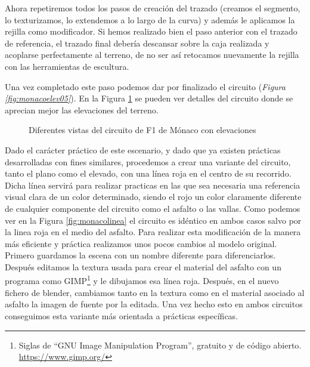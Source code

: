 Ahora repetiremos todos los pasos de creación del trazado (creamos el segmento, lo texturizamos, lo extendemos a lo largo de la curva) y además le aplicamos la rejilla como modificador. Si hemos realizado bien el paso anterior con el trazado de referencia, el trazado final debería descansar sobre la caja realizada y acoplarse perfectamente al terreno, de no ser así retocamos nuevamente la rejilla con las herramientas de escultura. 

Una vez completado este paso podemos dar por finalizado el circuito (\textit{Figura \ref{fig:monacoelev05}}). En la Figura \ref{fig:monacoelevvistas} se pueden ver detalles del circuito donde se aprecian mejor las elevaciones del terreno.

\begin{figure}[h]
	\centering
	\hspace{0.04\textwidth}	
	\vspace{0.03\textwidth}
	\hspace{0.04\textwidth}
	\caption{Diferentes vistas del circuito de F1 de Mónaco con elevaciones} \label{fig:monacoelevvistas}
\end{figure}

Dado el carácter práctico de este escenario, y dado que ya existen prácticas desarrolladas con fines similares, procedemos a crear una variante del circuito, tanto el plano como el elevado, con una línea roja en el centro de su recorrido. Dicha línea servirá para realizar practicas en las que sea necesaria una referencia visual clara de un color determinado, siendo el rojo un color claramente diferente de cualquier componente del circuito como el asfalto o las vallas. Como podemos ver en la Figura \ref{fig:monacolinea} el circuito es idéntico en ambos casos salvo por la linea roja en el medio del asfalto. Para realizar esta modificación de la manera más eficiente y práctica realizamos unos pocos cambios al modelo original. Primero guardamos la escena con un nombre diferente para diferenciarlos. Después editamos la textura usada para crear el material del asfalto con un programa como GIMP\footnote{Siglas de “GNU Image Manipulation Program”, gratuito y de código abierto. \url{https://www.gimp.org/}} y le dibujamos esa línea roja. Después, en el nuevo fichero de blender, cambiamos tanto en la textura como en el material asociado al asfalto la imagen de fuente por la editada. Una vez hecho esto en ambos circuitos conseguimos esta variante más orientada a prácticas específicas. 

